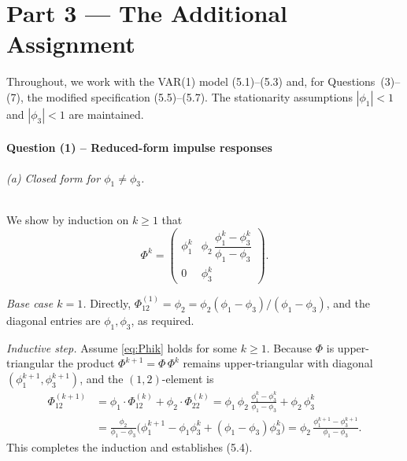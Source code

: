 \documentclass[12pt]{article}
\begin{document}
\part{Part 3 --- The Additional Assignment}
\setcounter{section}{0}
\setcounter{figure}{0}
\setcounter{table}{0}
\setcounter{equation}{0}
\renewcommand{\thefigure}{3.\arabic{figure}}
\renewcommand{\thetable}{3.\arabic{table}}
\renewcommand{\theequation}{3.\arabic{equation}}

Throughout, we work with the VAR(1) model (5.1)--(5.3) and, for Questions~(3)--(7), the modified specification (5.5)--(5.7). The stationarity assumptions $|\phi_1|<1$ and $|\phi_3|<1$ are maintained.

\subsection*{Question (1) -- Reduced-form impulse responses}\label{sec:p3-q1}

\paragraph{(a) Closed form for $\phi_1\neq\phi_3$.} We show by induction on $k\geq 1$ that
\begin{equation}
\Phi^{k}=\begin{pmatrix} \phi_1^{k} & \phi_2\,\dfrac{\phi_1^{k}-\phi_3^{k}}{\phi_1-\phi_3} \\[4pt] 0 & \phi_3^{k}\end{pmatrix}. \label{eq:Phik}
\end{equation}

\textit{Base case $k=1$.} Directly, $\Phi^{(1)}_{12}=\phi_2=\phi_2(\phi_1-\phi_3)/(\phi_1-\phi_3)$, and the diagonal entries are $\phi_1,\phi_3$, as required.

\textit{Inductive step.} Assume \eqref{eq:Phik} holds for some $k\geq 1$. Because $\Phi$ is upper-triangular the product $\Phi^{k+1}=\Phi\,\Phi^{k}$ remains upper-triangular with diagonal $(\phi_1^{k+1},\phi_3^{k+1})$, and the $(1,2)$-element is
\begin{align*}
\Phi^{(k+1)}_{12} &= \phi_1\cdot\Phi^{(k)}_{12} + \phi_2\cdot\Phi^{(k)}_{22}
= \phi_1\,\phi_2\,\frac{\phi_1^{k}-\phi_3^{k}}{\phi_1-\phi_3} + \phi_2\,\phi_3^{k}\\
&= \frac{\phi_2}{\phi_1-\phi_3}\Big(\phi_1^{k+1}-\phi_1\phi_3^{k}+(\phi_1-\phi_3)\phi_3^{k}\Big)
= \phi_2\,\frac{\phi_1^{k+1}-\phi_3^{k+1}}{\phi_1-\phi_3}.
\end{align*}
This completes the induction and establishes (5.4).
\end{document}
